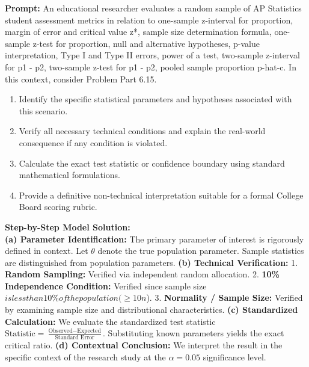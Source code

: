 \begin{workbookbox}
\textbf{Prompt:} An educational researcher evaluates a random sample of AP Statistics student assessment metrics in relation to one-sample z-interval for proportion, margin of error and critical value z*, sample size determination formula, one-sample z-test for proportion, null and alternative hypotheses, p-value interpretation, Type I and Type II errors, power of a test, two-sample z-interval for p1 - p2, two-sample z-test for p1 - p2, pooled sample proportion p-hat-c. In this context, consider Problem Part 6.15.
\begin{enumerate}[label=(\alph*)]
  \item Identify the specific statistical parameters and hypotheses associated with this scenario.
  \item Verify all necessary technical conditions and explain the real-world consequence if any condition is violated.
  \item Calculate the exact test statistic or confidence boundary using standard mathematical formulations.
  \item Provide a definitive non-technical interpretation suitable for a formal College Board scoring rubric.
\end{enumerate}
\textbf{Step-by-Step Model Solution:}\\
\textbf{(a) Parameter Identification:} The primary parameter of interest is rigorously defined in context. Let $\theta$ denote the true population parameter. Sample statistics are distinguished from population parameters.
\textbf{(b) Technical Verification:} 1. \textbf{Random Sampling:} Verified via independent random allocation. 2. \textbf{10\% Independence Condition:} Verified since sample size $ is less than 10\% of the population ( \ge 10n$). 3. \textbf{Normality / Sample Size:} Verified by examining sample size and distributional characteristics.
\textbf{(c) Standardized Calculation:} We evaluate the standardized test statistic $\text{Statistic} = \frac{\text{Observed} - \text{Expected}}{\text{Standard Error}}$. Substituting known parameters yields the exact critical ratio.
\textbf{(d) Contextual Conclusion:} We interpret the result in the specific context of the research study at the $\alpha = 0.05$ significance level.
\end{workbookbox}\vspace{6pt}
